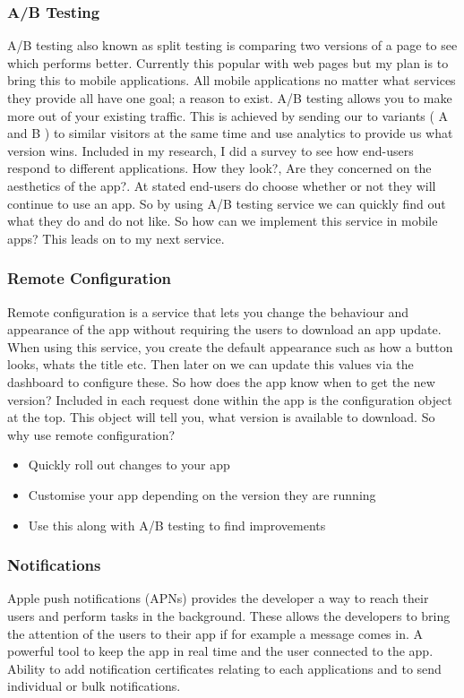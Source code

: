 \subsubsection{A/B Testing}
A/B testing also known as split testing is comparing two versions of a page to see which performs better. Currently this popular with web pages but my plan is to bring this to mobile applications. All mobile applications no matter what services they provide all have one goal; a reason to exist. A/B testing allows you to make more out of your existing traffic. This is achieved by sending our to variants ( A and B ) to similar visitors at the same time and use analytics to provide us what version wins. Included in my research, I did a survey to see how end-users respond to different applications. How they look?, Are they concerned on the aesthetics of the app?. At stated end-users do choose whether or not they will continue to use an app. So by using A/B testing service we can quickly find out what they do and do not like. So how can we implement this service in mobile apps? This leads on to my next service.

\subsubsection{Remote Configuration}
Remote configuration is a service that lets you change the behaviour and appearance of the app without requiring the users to download an app update. When using this service, you create the default appearance such as how a button looks, whats the title etc. Then later on we can update this values via the dashboard to configure these. So how does the app know when to get the new version? Included in each request done within the app is the configuration object at the top. This object will tell you, what version is available to download. So why use remote configuration? 

\begin{itemize}
  \item Quickly roll out changes to your app
  \item Customise your app depending on the version they are running
  \item Use this along with A/B testing to find improvements
\end{itemize}

\subsubsection{Notifications}
Apple push notifications (APNs) provides the developer a way to reach their users and perform tasks in the background. These allows the developers to bring the attention of the users to their app if for example a message comes in. A powerful tool to keep the app in real time and the user connected to the app. Ability to add notification certificates relating to each applications and to send individual or bulk notifications.

